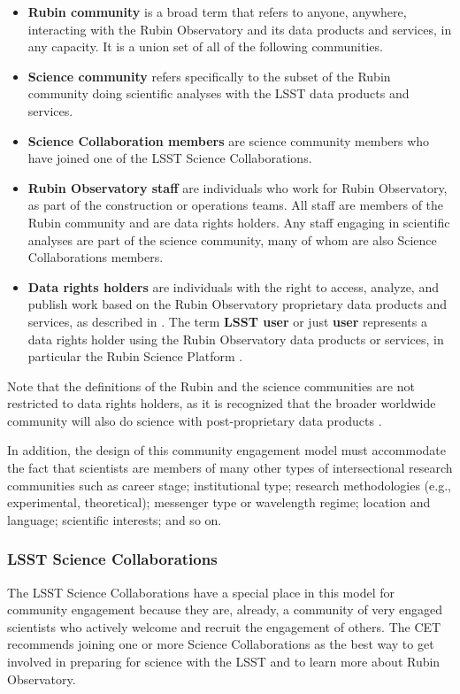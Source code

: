 \documentclass[DM,lsstdraft,toc]{lsstdoc}
\begin{document}
\begin{itemize}
\item \textbf{Rubin community} is a broad term that refers to anyone, anywhere, interacting with the Rubin Observatory and its data products and services, in any capacity. It is a union set of all of the following communities.
\item \textbf{Science community} refers specifically to the subset of the Rubin community doing scientific analyses with the LSST data products and services.
\item \textbf{Science Collaboration members} are science community members who have joined one of the LSST Science Collaborations.
\item \textbf{Rubin Observatory staff} are individuals who work for Rubin Observatory, as part of the construction or operations teams. All staff are members of the Rubin community and are data rights holders. Any staff engaging in scientific analyses are part of the science community, many of whom are also Science Collaborations members.
\item \textbf{Data rights holders} are individuals with the right to access, analyze, and publish work based on the Rubin Observatory proprietary data products and services, as described in . The term \textbf{LSST user} or just \textbf{user} represents a data rights holder using the Rubin Observatory data products or services, in particular the Rubin Science Platform .
\end{itemize}

Note that the definitions of the Rubin and the science communities are not restricted to data rights holders, as it is recognized that the broader worldwide community will also do science with post-proprietary data products .

In addition, the design of this community engagement model must accommodate the fact that scientists are members of many other types of intersectional research communities such as career stage; institutional type; research methodologies (e.g., experimental, theoretical); messenger type or wavelength regime; location and language; scientific interests; and so on.


\subsubsection{LSST Science Collaborations}

The LSST Science Collaborations have a special place in this model for community engagement because they are, already, a community of very engaged scientists who actively welcome and recruit the engagement of others.
The CET recommends joining one or more Science Collaborations as the best way to get involved in preparing for science with the LSST and to learn more about Rubin Observatory.
\end{document}
